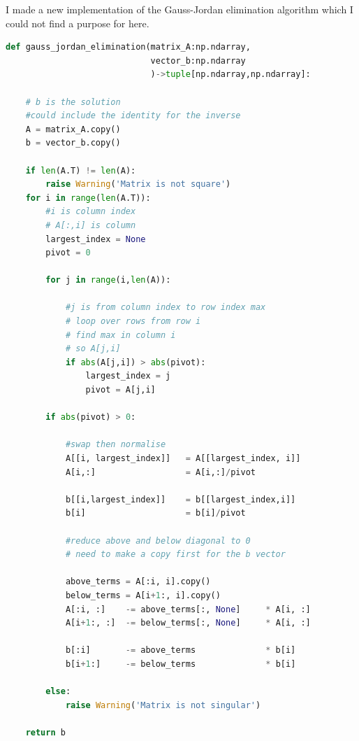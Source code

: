 \documentclass{article}
\begin{document}
I made a new implementation of the Gauss-Jordan elimination algorithm which I could not find a purpose for here.
\begin{lstlisting}[language=Python]
def gauss_jordan_elimination(matrix_A:np.ndarray,
                             vector_b:np.ndarray
                             )->tuple[np.ndarray,np.ndarray]:

    # b is the solution
    #could include the identity for the inverse
    A = matrix_A.copy()
    b = vector_b.copy()

    if len(A.T) != len(A):
        raise Warning('Matrix is not square')
    for i in range(len(A.T)):
        #i is column index
        # A[:,i] is column
        largest_index = None
        pivot = 0

        for j in range(i,len(A)):

            #j is from column index to row index max
            # loop over rows from row i
            # find max in column i
            # so A[j,i]
            if abs(A[j,i]) > abs(pivot):
                largest_index = j
                pivot = A[j,i]

        if abs(pivot) > 0:

            #swap then normalise
            A[[i, largest_index]]   = A[[largest_index, i]]
            A[i,:]                  = A[i,:]/pivot

            b[[i,largest_index]]    = b[[largest_index,i]]
            b[i]                    = b[i]/pivot

            #reduce above and below diagonal to 0
            # need to make a copy first for the b vector

            above_terms = A[:i, i].copy()
            below_terms = A[i+1:, i].copy()
            A[:i, :]    -= above_terms[:, None]     * A[i, :]
            A[i+1:, :]  -= below_terms[:, None]     * A[i, :]

            b[:i]       -= above_terms              * b[i]
            b[i+1:]     -= below_terms              * b[i]

        else:
            raise Warning('Matrix is not singular')

    return b
\end{lstlisting}
\end{document}
